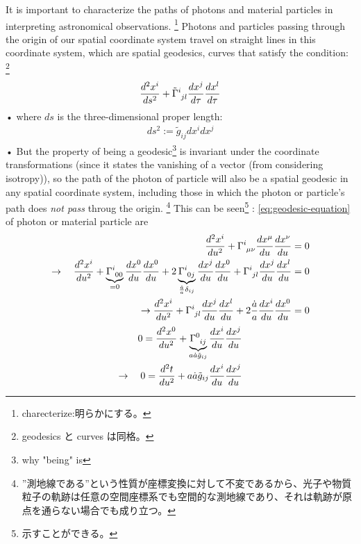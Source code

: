 \documentclass[11pt,a4paper,dvipdfmx]{jsarticle}
\theoremstyle{plain}
\theoremstyle{break}
\newcommand{\tilg}{\tilde{g}}
\newcommand{\tensorGamma}[1]{\tensor{\Gamma}{ #1}}
\begin{document}
It is important to characterize the paths of photons and material particles in interpreting astronomical observations. \footnote{charecterize:明らかにする。}
Photons and particles passing through the origin of our spatial coordinate system  travel on straight lines in this coordinate system, which are spatial geodesics, curves that satisfy the condition: \footnote{geodesics と curves は同格。}
\begin{align}
\frac{d^2x^{i}}{ds^2} + \tensor{\tilde{\Gamma}}{^i_{jl}} \frac{dx^j}{d\tau} \frac{dx^l}{d\tau}
\end{align}•%
where $ds$ is the three-dimensional proper length:
\begin{align}
 ds^2 := \tilde{g}_{ij} dx^i dx^j
\end{align}•%
But the property of being a geodesic\footnote{why "being" is} is invariant under the coordinate transformations  (since it states the vanishing of a vector (from considering isotropy)),
so the path of the  photon of particle will also be a spatial geodesic in any spatial coordinate system,
including those in which the photon or particle's path does \textit{not pass} throug the origin.
\footnote{”測地線である”という性質が座標変換に対して不変であるから、光子や物質粒子の軌跡は任意の空間座標系でも空間的な測地線であり、それは軌跡が原点を通らない場合でも成り立つ。}
This can be seen\footnote{示すことができる。} :
\eqref{eq:geodesic-equation} of photon or material particle are
\begin{align}
  \frac{d^2 x^{i}}{du^{2}}+\tensorGamma{^i_{\mu\nu}}\frac{dx^\mu}{du}\frac{dx^\nu}{du} &=0  \\
\rightarrow\quad
  \frac{d^2 x^{i}}{du^{2}}
  + \underbrace{\tensorGamma{^i_{00}}}_{=0}\frac{dx^0}{du}\frac{dx^0}{du}
  + 2 \underbrace{\tensorGamma{^i_{0j}}}_{\frac{\dot{a}}{a} \delta_{ij}}
  \frac{dx^j}{du}\frac{dx^0}{du}
  + \tensorGamma{^i_{jl}}\frac{dx^j}{du}\frac{dx^l}{du} &= 0\\
  \rightarrow
  \frac{d^2 x^{i}}{du^{2}}
  + \tensorGamma{^i_{jl}}\frac{dx^j}{du}\frac{dx^l}{du}
  + 2 \frac{\dot{a}}{a} \frac{dx^i}{du}\frac{dx^0}{du}
  &= 0 \label{eq:1.1.26}
\end{align}
\begin{align}
  0=\frac{d^2 x^{0}}{du^{2}}+
  \underbrace{\tensorGamma{^0_{ij}}}_{a \dot{a}\tilde{g}_{ij}}\frac{dx^i}{du}\frac{dx^j}{du}   \\
  \rightarrow \quad 0 =  \frac{d^2t}{du^2} + a \dot{a} \tilg_{ij} \frac{dx^i}{du}\frac{dx^j}{du} \label{eq:1.1.26}
\end{align}
\end{document}
